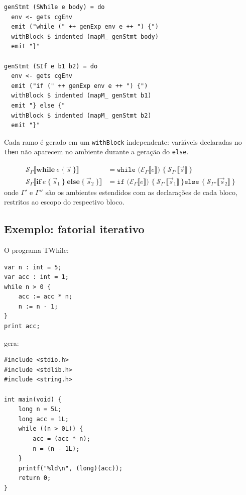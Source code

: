 \begin{verbatim}
genStmt (SWhile e body) = do
  env <- gets cgEnv
  emit ("while (" ++ genExp env e ++ ") {")
  withBlock $ indented (mapM_ genStmt body)
  emit "}"

genStmt (SIf e b1 b2) = do
  env <- gets cgEnv
  emit ("if (" ++ genExp env e ++ ") {")
  withBlock $ indented (mapM_ genStmt b1)
  emit "} else {"
  withBlock $ indented (mapM_ genStmt b2)
  emit "}"
\end{verbatim}

Cada ramo é gerado em um \texttt{withBlock} independente: variáveis declaradas
no \texttt{then} não aparecem no ambiente durante a geração do \texttt{else}.

\begin{Definition}\label{def:twhile-stmt}
\begin{align*}
\mathcal{S}_\Gamma\llbracket \mathbf{while}\ e\ \{\ \vec{s}\ \} \rrbracket
  &= \texttt{while (}\mathcal{E}_\Gamma\llbracket e \rrbracket\texttt{) \{}\
     \mathcal{S}_{\Gamma'}\llbracket \vec{s} \rrbracket\
     \texttt{\}} \\
\mathcal{S}_\Gamma\llbracket \mathbf{if}\ e\ \{\ \vec{s}_1\ \}\ \mathbf{else}\ \{\ \vec{s}_2\ \} \rrbracket
  &= \texttt{if (}\mathcal{E}_\Gamma\llbracket e \rrbracket\texttt{) \{}\ \mathcal{S}_{\Gamma'}\llbracket \vec{s}_1 \rrbracket\ \texttt{\} else \{}\ \mathcal{S}_{\Gamma''}\llbracket \vec{s}_2 \rrbracket\ \texttt{\}}
\end{align*}
onde $\Gamma'$ e $\Gamma''$ são os ambientes estendidos com as declarações de
cada bloco, restritos ao escopo do respectivo bloco.
\end{Definition}

\subsection{Exemplo: fatorial iterativo}

O programa TWhile:
\begin{verbatim}
var n : int = 5;
var acc : int = 1;
while n > 0 {
    acc := acc * n;
    n := n - 1;
}
print acc;
\end{verbatim}

gera:

\begin{verbatim}
#include <stdio.h>
#include <stdlib.h>
#include <string.h>

int main(void) {
    long n = 5L;
    long acc = 1L;
    while ((n > 0L)) {
        acc = (acc * n);
        n = (n - 1L);
    }
    printf("%ld\n", (long)(acc));
    return 0;
}
\end{verbatim}

